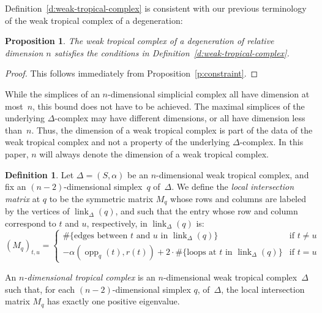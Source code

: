 \documentclass[11pt,reqno]{amsart}
\newtheorem{prop}[thm]{Proposition}
\theoremstyle{definition}
\newtheorem{defn}[thm]{Definition}
\newcommand{\defi}[1]{\emph{#1}}
\newcommand{\link}{\operatorname{link}}
\newcommand{\opp}{\operatorname{opp}}
\begin{document}
Definition~\ref{d:weak-tropical-complex} is consistent with our previous
terminology of the weak tropical complex of a degeneration:

\begin{prop}\label{p:weak-tropical-complex-degeneration}
The weak tropical complex of a degeneration of relative dimension $n$ satisfies
the conditions in Definition~\ref{d:weak-tropical-complex}.
\end{prop}

\begin{proof}
This follows immediately from Proposition~\ref{p:constraint}.
\end{proof}

\begin{rmk}
While the simplices of an $n$-dimensional simplicial complex all have dimension
at most~$n$, this bound does not have to be achieved. The maximal simplices of
the underlying $\Delta$-complex may have different dimensions, or all have
dimension less than~$n$. Thus, the dimension of a weak tropical complex is part
of the data of the weak tropical complex and not a property of the underlying
$\Delta$-complex. In this paper, $n$ will always denote the dimension of a weak
tropical complex.
\end{rmk}

\begin{defn}\label{d:tropical-complex}
Let $\Delta = (S, \alpha)$ be an $n$-dimensional weak tropical complex, and fix
an $(n-2)$-dimensional simplex~$q$ of~$\Delta$. We define the \defi{local
intersection matrix} at $q$
to be the symmetric matrix $M_q$ whose rows and columns are labeled by the
vertices of $\link_\Delta(q)$, and such that the entry whose row and column
correspond to $t$ and $u$, respectively, in $\link_\Delta(q)$ is:
\begin{equation}\label{eq:local-intersection-matrix}
(M_q)_{t,u} = \begin{cases}
\# \{\mbox{edges between $t$ and $u$ in $\link_\Delta(q)$}\} &
  \mbox{if $t \neq u$} \\
-\alpha(\opp_q(t),r(t)) + 2 \cdot\# \{\mbox{loops at $t$ in $\link_\Delta(q)$}\}&
  \mbox{if $t = u$}
\end{cases}
\end{equation}

An \defi{$n$-dimensional tropical complex} is an $n$-dimensional weak tropical
complex~$\Delta$ such that, for each $(n-2)$-dimensional simplex $q$,
of~$\Delta$, the local intersection matrix $M_q$ has exactly one positive
eigenvalue.
\end{defn}
\end{document}
